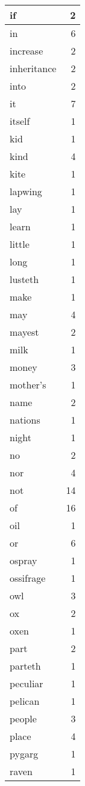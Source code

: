 \begin{center}
\begin{longtable}{l|r}
if & 2 \\ \hline
in & 6 \\ \hline
increase & 2 \\ \hline
inheritance & 2 \\ \hline
into & 2 \\ \hline
it & 7 \\ \hline
itself & 1 \\ \hline
kid & 1 \\ \hline
kind & 4 \\ \hline
kite & 1 \\ \hline
lapwing & 1 \\ \hline
lay & 1 \\ \hline
learn & 1 \\ \hline
little & 1 \\ \hline
long & 1 \\ \hline
lusteth & 1 \\ \hline
make & 1 \\ \hline
may & 4 \\ \hline
mayest & 2 \\ \hline
milk & 1 \\ \hline
money & 3 \\ \hline
mother's & 1 \\ \hline
name & 2 \\ \hline
nations & 1 \\ \hline
night & 1 \\ \hline
no & 2 \\ \hline
nor & 4 \\ \hline
not & 14 \\ \hline
of & 16 \\ \hline
oil & 1 \\ \hline
or & 6 \\ \hline
ospray & 1 \\ \hline
ossifrage & 1 \\ \hline
owl & 3 \\ \hline
ox & 2 \\ \hline
oxen & 1 \\ \hline
part & 2 \\ \hline
parteth & 1 \\ \hline
peculiar & 1 \\ \hline
pelican & 1 \\ \hline
people & 3 \\ \hline
place & 4 \\ \hline
pygarg & 1 \\ \hline
raven & 1 \\ \hline

\end{longtable}
\end{center}
